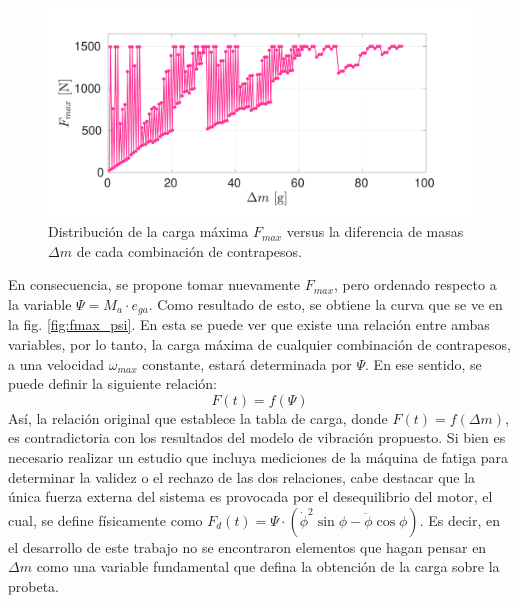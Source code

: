 \begin{figure}[h]
\centering
\includegraphics[width=\linewidth, trim={0cm 1cm 2cm 2cm},clip]{Imagenes/fmax_dm.pdf}
\caption{Distribución de la carga máxima $F_{max}$ versus la diferencia de masas $\Delta m$ de cada combinación de contrapesos.}
\label{fig:fmax_dm}
\end{figure}

En consecuencia, se propone tomar nuevamente $F_{max}$, pero ordenado respecto a la variable $\Psi = M_a \cdot e_{ga}$. Como resultado de esto, se obtiene la curva que se ve en la fig. \ref{fig:fmax_psi}. En esta se puede ver que existe una relación entre ambas variables, por lo tanto, la carga máxima de cualquier combinación de contrapesos, a una velocidad $\omega_{max}$ constante, estará determinada por $\Psi$. En ese sentido, se puede definir la siguiente relación:
\begin{equation}\label{eq:func_psi}
	F(t) = f(\Psi)
\end{equation}
Así, la relación original que establece la tabla de carga, donde $F(t) = f(\Delta m)$, es contradictoria con los resultados del modelo de vibración propuesto. Si bien es necesario realizar un estudio que incluya mediciones de la máquina de fatiga para determinar la validez o el rechazo de las dos relaciones, cabe destacar que la única fuerza externa del sistema es provocada por el desequilibrio del motor, el cual, se define físicamente como $F_d(t) = \Psi \cdot (\dot{\phi}^2 \sin\phi - \ddot{\phi} \cos\phi)$. Es decir, en el desarrollo de este trabajo no se encontraron elementos que hagan pensar en $\Delta m$ como una variable fundamental que defina la obtención de la carga sobre la probeta.

